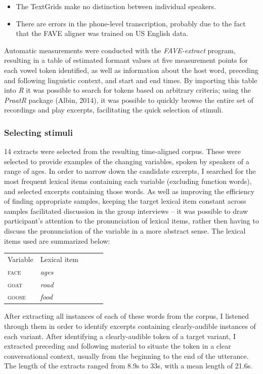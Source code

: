 \documentclass{article}
\begin{document}
\begin{itemize}
\item{The TextGrids make no distinction between individual speakers.}
\item{There are errors in the phone-level transcription, probably due to the fact that the FAVE aligner was trained on US English data.}
\end{itemize}

Automatic measurements were conducted with the \textit{FAVE-extract} program, resulting in a table of estimated formant values at five measurement points for each vowel token identified, as well as information about the host word, preceding and following linguistic context, and start and end times. By importing this table into \textit{R} it was possible to search for tokens based on arbitrary criteria; using the \textit{PraatR} package (Albin, 2014), it was possible to quickly browse the entire set of recordings and play excerpts, facilitating the quick selection of stimuli.

\subsubsection*{Selecting stimuli}
 14 extracts were selected from the resulting time-aligned corpus. These were selected to provide examples of the changing variables, spoken by speakers of a range of ages. In order to narrow down the candidate excerpts, I searched for the most frequent lexical items containing each variable (excluding function words), and selected excerpts containing those words. As well as improving the efficiency of finding appropriate samples, keeping the target lexical item constant across samples facilitated discussion in the group interviews -- it was possible to draw participant's attention to the pronunciation of lexical items, rather then having to discuss the pronunciation of the variable in a more abstract sense. The lexical items used are summarized below:

\begin{table}[h]
\centering
\begin{tabular}{|l|l|lll}
\cline{1-2}
Variable & Lexical item                  &  &  &  \\ \cline{1-2}
\textsc{face}     & \textit{ages}                       &  &  &  \\ \cline{1-2}
\textsc{goat}     & \textit{road}                        &  &  &  \\ \cline{1-2}
\textsc{goose}    & \textit{food}                       &  &  &  \\ \cline{1-2}
\end{tabular}
\end{table}
After extracting all instances of each of these words from the corpus, I listened through them in order to identify excerpts containing clearly-audible instances of each variant. After identifying a clearly-audible token of a target variant, I extracted preceding and following material to situate the token in a clear conversational context, usually from the beginning to the end of the utterance. The length of the extracts ranged from 8.9s to 33s, with a mean length of 21.6s. 
\end{document}

